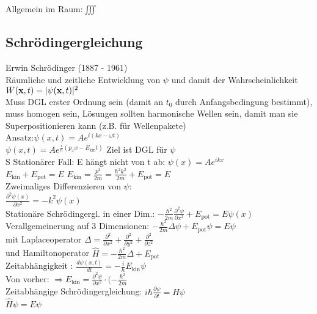 \documentclass[fs, footer]{latex4ei}
\begin{document}
\begin{multicols*}{4}
Allgemein im Raum:$\iiint$\\

\subsection{Schrödingergleichung}
Erwin Schrödinger (1887 - 1961)\\

Räumliche und zeitliche Entwicklung von $\psi$ und damit der Wahrscheinlichkeit $W(\textbf{x}, t) = |\psi(\textbf{x}, t)|^2$\\
Muss DGL erster Ordnung sein (damit an $t_0$ durch Anfangsbedingung bestimmt), muss homogen sein, Lösungen sollten harmonische Wellen sein, damit man sie Superpositionieren kann (z.B. für Wellenpakete)\\

Ansatz:$\psi(x,t) = Ae^{i(kx-\omega t)}$\\
$\psi(x,t) = Ae^{\frac{i}{\hbar} (p_x x - E_{\text{kin}} t) }$ Ziel ist DGL für $\psi$\\S
Stationärer Fall: E hängt nicht von t ab: $\psi(x) = Ae^{ikx}$\\
$E_{\text{kin}} + E_{\text{pot}} = E$ $E_{\text{kin}} = \frac{p^2}{2m} = \frac{\hbar^2 k^2}{2m}+ E_{\text{pot}} = E$\\
Zweimaliges Differenzieren von $\psi$:\\
$\frac{\partial^2\psi(x)}{\partial x^2} = -k^2\psi(x)$\\

Stationäre Schrödingergl. in einer Dim.: $-\frac{\hbar^2}{2m}\frac{\partial^2\psi}{\partial x^2}+E_{\text{pot}} = E\psi(x)$\\

Verallgemeinerung auf 3 Dimensionen: 
$ - \frac{\hbar^2}{2m}\Delta \psi + E_{\text{pot}} \psi = E \psi$\\
mit Laplaceoperator $\Delta = \frac{\partial^2}{\partial x^2} + \frac{\partial^2}{\partial y^2} + \frac{\partial^2}{\partial z^2}$\\ und Hamiltonoperator $\hat H = - \frac{\hbar^2}{2m}\Delta + E_{\text{pot}}$\\

Zeitabhängigkeit : $\frac{d\psi(x,t)}{dt} = - \frac{i}{\hbar}E_{\text{kin}}\psi$\\
Von vorher: $\Rightarrow E_{\text{kin}} = \frac{\partial^2\psi}{\partial x^2}\cdot( - \frac{\hbar^2}{2m}$\\

Zeitabhängige Schrödingergleichung: $i\hbar \frac{\partial \psi}{\partial t}= \hat H \psi$\\
$\hat H \psi = E \psi$\\



\end{multicols*}
\end{document}
